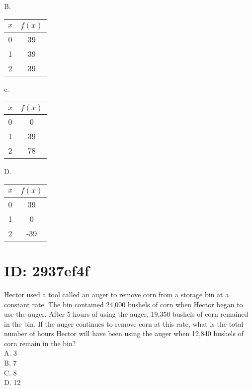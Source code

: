 B.

\begin{center}
\begin{tabular}{|c|c|}
\hline
$x$ & $f(x)$ \\
\hline
0 & 39 \\
\hline
1 & 39 \\
\hline
2 & 39 \\
\hline
\end{tabular}
\end{center}

c.

\begin{center}
\begin{tabular}{|c|c|}
\hline
$x$ & $f(x)$ \\
\hline
0 & 0 \\
\hline
1 & 39 \\
\hline
2 & 78 \\
\hline
\end{tabular}
\end{center}

D.

\begin{center}
\begin{tabular}{|c|c|}
\hline
$x$ & $f(x)$ \\
\hline
0 & 39 \\
\hline
1 & 0 \\
\hline
2 & -39 \\
\hline
\end{tabular}
\end{center}







\section*{ID: 2937ef4f}
Hector used a tool called an auger to remove corn from a storage bin at a constant rate. The bin contained 24,000 bushels of corn when Hector began to use the auger. After 5 hours of using the auger, 19,350 bushels of corn remained in the bin. If the auger continues to remove corn at this rate, what is the total number of hours Hector will have been using the auger when 12,840 bushels of corn remain in the bin?\\
A. 3\\
B. 7\\
C. 8\\
D. 12






